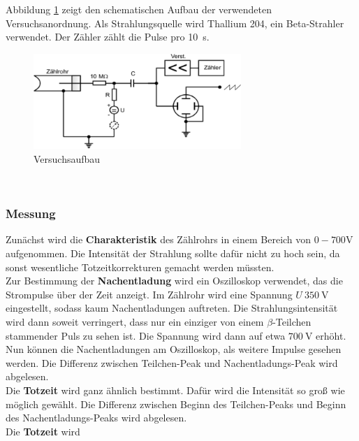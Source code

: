 Abbildung \ref{fig:Versuchsaufbau} zeigt den schematischen Aufbau der verwendeten Versuchsanordnung. Als Strahlungsquelle wird Thallium 204, ein Beta-Strahler verwendet. Der Zähler zählt die Pulse pro \SI{10}{\second}.
\begin{figure}[h!]
	\centering
	\includegraphics[width=0.7\textwidth]{Versuchsaufbau.pdf}
	\caption{Versuchsaufbau}
	\label{fig:Versuchsaufbau}
\end{figure} \\
\subsubsection*{Messung}
Zunächst wird die \textbf{Charakteristik} des Zählrohrs in einem Bereich von $0-700$V aufgenommen. Die Intensität der Strahlung sollte dafür nicht zu hoch sein, da sonst wesentliche Totzeitkorrekturen gemacht werden müssten. \\
Zur Bestimmung der \textbf{Nachentladung} wird ein Oszilloskop verwendet, das die Strompulse über der Zeit anzeigt. Im Zählrohr wird eine Spannung $U~\SI{350}{\volt}$ eingestellt, sodass kaum Nachentladungen auftreten. Die Strahlungsintensität wird dann soweit verringert, dass nur ein einziger von einem $\beta$-Teilchen stammender Puls zu sehen ist. Die Spannung wird dann auf etwa $\SI{700}{\volt}$ erhöht. Nun können die Nachentladungen am Oszilloskop, als weitere Impulse gesehen werden. Die Differenz zwischen Teilchen-Peak und Nachentladungs-Peak wird abgelesen. \\
Die \textbf{Totzeit} wird ganz ähnlich bestimmt. Dafür wird die Intensität so groß wie möglich gewählt. Die Differenz zwischen Beginn des Teilchen-Peaks und Beginn des Nachentladungs-Peaks wird abgelesen. \\
Die \textbf{Totzeit} wird 